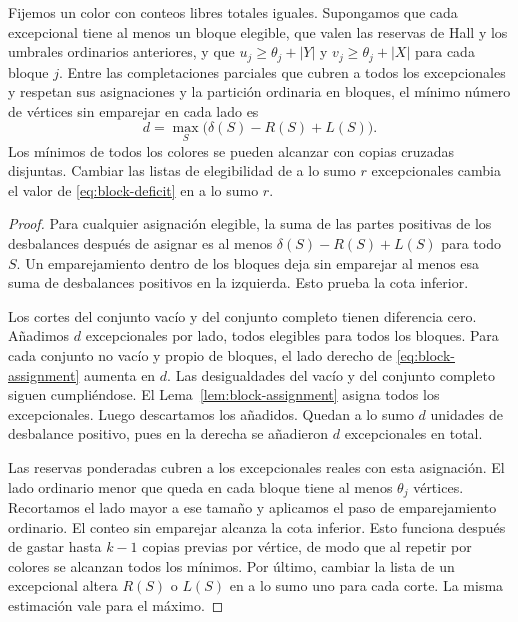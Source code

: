 \begin{theorem}\label{thm:block-deficit}
Fijemos un color con conteos libres totales iguales. Supongamos que cada excepcional tiene al menos un bloque elegible, que valen las reservas de Hall y los umbrales ordinarios anteriores, y que \(u_j\ge\theta_j+|Y|\) y \(v_j\ge\theta_j+|X|\) para cada bloque \(j\). Entre las completaciones parciales que cubren a todos los excepcionales y respetan sus asignaciones y la partición ordinaria en bloques, el mínimo número de vértices sin emparejar en cada lado es
\[
 d=\max_S\bigl(\delta(S)-R(S)+L(S)\bigr).
 \tag{E}\label{eq:block-deficit}
\]
Los mínimos de todos los colores se pueden alcanzar con copias cruzadas disjuntas. Cambiar las listas de elegibilidad de a lo sumo \(r\) excepcionales cambia el valor de \eqref{eq:block-deficit} en a lo sumo \(r\).
\end{theorem}

\begin{proof}
Para cualquier asignación elegible, la suma de las partes positivas de los desbalances después de asignar es al menos \(\delta(S)-R(S)+L(S)\) para todo \(S\). Un emparejamiento dentro de los bloques deja sin emparejar al menos esa suma de desbalances positivos en la izquierda. Esto prueba la cota inferior.

Los cortes del conjunto vacío y del conjunto completo tienen diferencia cero. Añadimos \(d\) excepcionales por lado, todos elegibles para todos los bloques. Para cada conjunto no vacío y propio de bloques, el lado derecho de \eqref{eq:block-assignment} aumenta en \(d\). Las desigualdades del vacío y del conjunto completo siguen cumpliéndose. El Lema~\ref{lem:block-assignment} asigna todos los excepcionales. Luego descartamos los añadidos. Quedan a lo sumo \(d\) unidades de desbalance positivo, pues en la derecha se añadieron \(d\) excepcionales en total.

Las reservas ponderadas cubren a los excepcionales reales con esta asignación. El lado ordinario menor que queda en cada bloque tiene al menos \(\theta_j\) vértices. Recortamos el lado mayor a ese tamaño y aplicamos el paso de emparejamiento ordinario. El conteo sin emparejar alcanza la cota inferior. Esto funciona después de gastar hasta \(k-1\) copias previas por vértice, de modo que al repetir por colores se alcanzan todos los mínimos. Por último, cambiar la lista de un excepcional altera \(R(S)\) o \(L(S)\) en a lo sumo uno para cada corte. La misma estimación vale para el máximo.
\end{proof}
